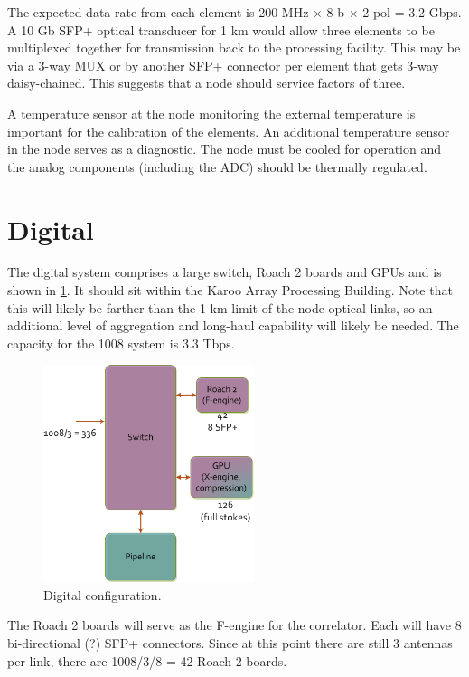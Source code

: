 \documentclass[11pt]{article}
\begin{document}
The expected data-rate from each element is 200 MHz $\times$ 8 b $\times$ 2 pol = 3.2 Gbps.  A 10 Gb SFP+ optical transducer for 1 km would allow three elements to be multiplexed together for transmission back to the processing facility.  This may be via a 3-way MUX or by another SFP+ connector per element that gets 3-way daisy-chained.  This suggests that a node should service factors of three. 

A temperature sensor at the node monitoring the external temperature is important for the calibration of the elements.  An additional temperature sensor in the node serves as a diagnostic.  The node must be cooled for operation and the analog components (including the ADC) should be thermally regulated.

\section{Digital}
The digital system comprises a large switch, Roach 2 boards and GPUs and is shown in \ref{fig:digital}.  It should sit within the Karoo Array Processing Building.  Note that this will likely be farther than the 1 km limit of the node optical links, so an additional level of aggregation and long-haul capability will likely be needed.  The capacity for the 1008 system is 3.3 Tbps.

\begin{figure}[h]
\centering
\includegraphics[width=0.55\textwidth]{Digital.png}
\caption{Digital configuration.}
\label{fig:digital}
\end{figure}

The Roach 2 boards will serve as the F-engine for the correlator.  Each will have 8 bi-directional (?) SFP+ connectors.  Since at this point there are still 3 antennas per link, there are 1008/3/8 = 42 Roach 2 boards.
\end{document}
